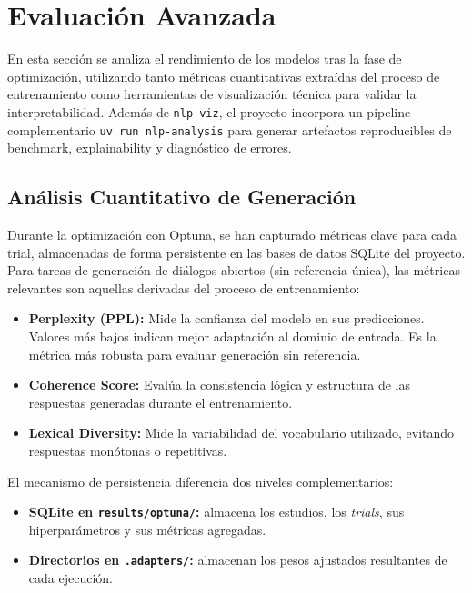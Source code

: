 \section{Evaluación Avanzada}

En esta sección se analiza el rendimiento de los modelos tras la fase de optimización, utilizando tanto métricas cuantitativas extraídas del proceso de entrenamiento como herramientas de visualización técnica para validar la interpretabilidad. Además de \texttt{nlp-viz}, el proyecto incorpora un pipeline complementario \texttt{uv run nlp-analysis} para generar artefactos reproducibles de benchmark, explainability y diagnóstico de errores.

\subsection{Análisis Cuantitativo de Generación}

Durante la optimización con Optuna, se han capturado métricas clave para cada trial, almacenadas de forma persistente en las bases de datos SQLite del proyecto. Para tareas de generación de diálogos abiertos (sin referencia única), las métricas relevantes son aquellas derivadas del proceso de entrenamiento:

\begin{itemize}
    \item \textbf{Perplexity (PPL):} Mide la confianza del modelo en sus predicciones. Valores más bajos indican mejor adaptación al dominio de entrada. Es la métrica más robusta para evaluar generación sin referencia.
    \item \textbf{Coherence Score:} Evalúa la consistencia lógica y estructura de las respuestas generadas durante el entrenamiento.
    \item \textbf{Lexical Diversity:} Mide la variabilidad del vocabulario utilizado, evitando respuestas monótonas o repetitivas.
\end{itemize}

El mecanismo de persistencia diferencia dos niveles complementarios:
\begin{itemize}
    \item \textbf{SQLite en \texttt{results/optuna/}:} almacena los estudios, los \textit{trials}, sus hiperparámetros y sus métricas agregadas.
    \item \textbf{Directorios en \texttt{.adapters/}:} almacenan los pesos ajustados resultantes de cada ejecución.
\end{itemize}

